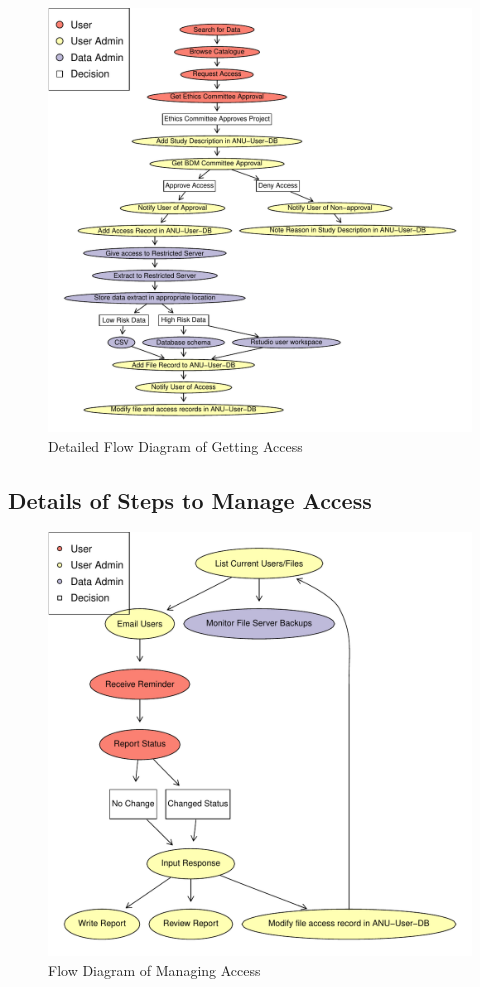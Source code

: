 \documentclass[a4paper]{article}
\begin{document}
\begin{figure}[!h]
\centering
\includegraphics[width=1.4\textwidth]{DataAccessFlowDiagram-GettingAccess.pdf}
\caption{Detailed Flow Diagram of Getting Access}
\label{fig:DataAccessFlowDiagram-GettingAccess}
\end{figure}
\clearpage
\subsection{Details of Steps to Manage Access}
\label{sec-5-2}


\begin{figure}[!h]
\centering
\includegraphics[width=1.4\textwidth]{DataAccessFlowDiagram-ManagingAccess.pdf}
\caption{Flow Diagram of Managing Access}
\label{fig:DataAccessFlowDiagram-ManagingAccess}
\end{figure}
\clearpage
\end{document}
